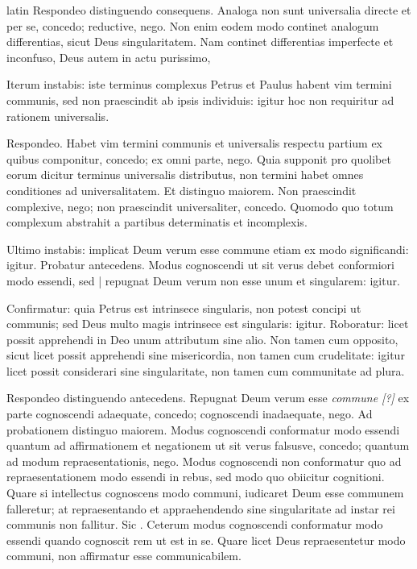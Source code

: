 \begin{otherlanguage*}{latin}
\pstart
  Respondeo distinguendo consequens. Analoga non sunt universalia directe et per se, concedo; reductive, nego. Non enim eodem modo continet analogum differentias, sicut Deus singularitatem. Nam continet differentias imperfecte et inconfuso, Deus autem in actu purissimo, 
\pend

\pstart
  Iterum instabis: iste terminus complexus Petrus et Paulus habent vim termini communis, sed non praescindit ab ipsis individuis: igitur hoc non requiritur ad rationem universalis. 
\pend

\pstart
  Respondeo. Habet vim termini communis et universalis respectu partium ex quibus componitur, concedo; ex omni parte, nego. Quia supponit pro quolibet eorum dicitur terminus universalis distributus, non termini habet omnes conditiones ad universalitatem. Et distinguo maiorem. Non praescindit complexive, nego; non praescindit universaliter, concedo. Quomodo quo totum complexum abstrahit a partibus determinatis et incomplexis. 
\pend

\pstart
  Ultimo instabis: implicat Deum verum esse commune etiam ex modo significandi: igitur. Probatur antecedens. Modus cognoscendi ut sit verus debet conformiori modo essendi, sed \textnormal{|} repugnat Deum verum non esse unum et singularem: igitur. 
\pend

\pstart
  Confirmatur: quia Petrus est intrinsece singularis, non potest concipi ut communis; sed Deus multo magis intrinsece est singularis: igitur. Roboratur: licet possit apprehendi in Deo unum attributum sine alio. Non tamen cum opposito, sicut licet possit apprehendi sine misericordia, non tamen cum crudelitate: igitur licet possit considerari sine singularitate, non tamen cum communitate ad plura. 
\pend

\pstart
  Respondeo distinguendo antecedens. Repugnat Deum verum esse \emph{commune [?]} ex parte cognoscendi adaequate, concedo; cognoscendi inadaequate, nego. Ad probationem distinguo maiorem. Modus cognoscendi conformatur modo essendi quantum ad affirmationem et negationem ut sit verus falsusve, concedo; quantum ad modum repraesentationis, nego. Modus cognoscendi non conformatur quo ad repraesentationem modo essendi in rebus, sed modo quo obiicitur cognitioni. Quare si intellectus cognoscens modo communi, iudicaret Deum esse communem falleretur; at repraesentando et appraehendendo sine singularitate ad instar rei communis non fallitur. Sic . Ceterum modus cognoscendi conformatur modo essendi quando cognoscit rem ut est in se. Quare licet Deus repraesentetur modo communi, non affirmatur esse communicabilem. 
\pend


\end{otherlanguage*}
